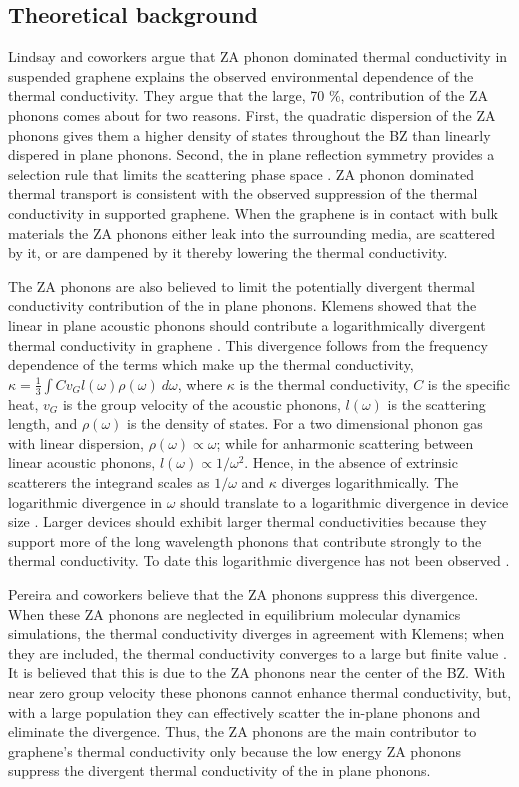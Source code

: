 \subsection{Theoretical background}
Lindsay and coworkers argue that ZA phonon dominated thermal conductivity in suspended graphene explains the observed environmental dependence of the thermal conductivity.
They argue that the large, 70 \%, contribution of the ZA phonons comes about for two reasons.
First, the quadratic dispersion of the ZA phonons gives them a higher density of states throughout the BZ than linearly dispered in plane phonons.
Second, the in plane reflection symmetry provides a selection rule that limits the scattering phase space \cite{Lindsay2010}.
ZA phonon dominated thermal transport is consistent with the observed suppression of the thermal conductivity in supported graphene.
When the graphene is in contact with bulk materials the ZA phonons either leak into the surrounding media, are scattered by it, or are dampened by it thereby lowering the thermal conductivity.

The ZA phonons are also believed to limit the potentially divergent thermal conductivity contribution of the in plane phonons.
Klemens showed that the linear in plane acoustic phonons should contribute a logarithmically divergent thermal conductivity in graphene \cite{Klemens2001}.
This divergence follows from the frequency dependence of the terms which make up the thermal conductivity, $\kappa=\frac{1}{3} \int C v_G l(\omega) \rho(\omega) \ d\omega $, where $\kappa$ is the thermal conductivity, $C$ is the specific heat, $v_G$ is the group velocity of the acoustic phonons, $l(\omega)$ is the scattering length, and $\rho(\omega)$ is the density of states.
For a two dimensional phonon gas with linear dispersion, $\rho(\omega) \propto \omega$; while for anharmonic scattering between linear acoustic phonons, $l(\omega) \propto 1/\omega^2$.
Hence, in the absence of extrinsic scatterers the integrand scales as $1/\omega$ and $\kappa$ diverges logarithmically.
The logarithmic divergence in $\omega$ should translate to a logarithmic divergence in device size \cite{Klemens2001}.
Larger devices should exhibit larger thermal conductivities because they support more of the long wavelength phonons that contribute strongly to the thermal conductivity.
To date this logarithmic divergence has not been observed \cite{Chen2011a}.

Pereira and coworkers believe that the ZA phonons suppress this divergence.
When these ZA phonons are neglected in equilibrium molecular dynamics simulations, the thermal conductivity diverges in agreement with Klemens; when they are included, the thermal conductivity converges to a large but finite value \cite{Pereira2013}.
It is believed that this is due to the ZA phonons near the center of the BZ.
With near zero group velocity these phonons cannot enhance thermal conductivity, but, with a large population they can effectively scatter the in-plane phonons and eliminate the divergence.
Thus, the ZA phonons are the main contributor to graphene's thermal conductivity only because the low energy ZA phonons suppress the divergent thermal conductivity of the in plane phonons.

